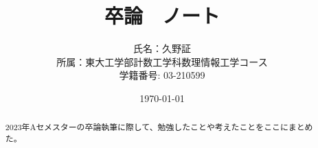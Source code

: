 \documentclass{ltjsarticle}
\title{卒論　ノート}
\author{氏名：久野証\\所属：東大工学部計数工学科数理情報工学コース\\学籍番号: 03-210599}
\date{\today}
\begin{document}
  \maketitle
  \tableofcontents
  \begin{abstract}
    2023年Aセメスターの卒論執筆に際して、勉強したことや考えたことをここにまとめた。
  \end{abstract}
  \clearpage

  
  
  
  
\end{document}
